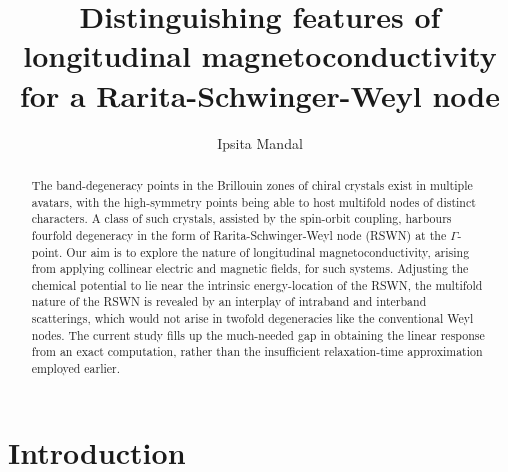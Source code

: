 \documentclass[aps,prb,onecolumn,nofootinbib,citeautoscript,10pt, showkeys]{revtex4-2}
\begin{document}
\title{Distinguishing features of longitudinal magnetoconductivity for a Rarita-Schwinger-Weyl node}



\author{Ipsita Mandal}


 
\begin{abstract} 
The band-degeneracy points in the Brillouin zones of chiral crystals exist in multiple avatars, with the high-symmetry points being able to host multifold nodes of distinct characters. A class of such crystals, assisted by the spin-orbit coupling, harbours fourfold degeneracy in the form of Rarita-Schwinger-Weyl node (RSWN) at the $\Gamma$-point. Our aim is to explore the nature of longitudinal magnetoconductivity, arising from applying collinear electric and magnetic fields, for such systems. Adjusting the chemical potential to lie near the intrinsic energy-location of the RSWN, the multifold nature of the RSWN is revealed by an interplay of intraband and interband scatterings, which would not arise in twofold degeneracies like the conventional Weyl nodes. The current study fills up the much-needed gap in obtaining the linear response from an exact computation, rather than the insufficient relaxation-time approximation employed earlier. 
\end{abstract}



\maketitle

\tableofcontents


\section{Introduction}
\end{document}
